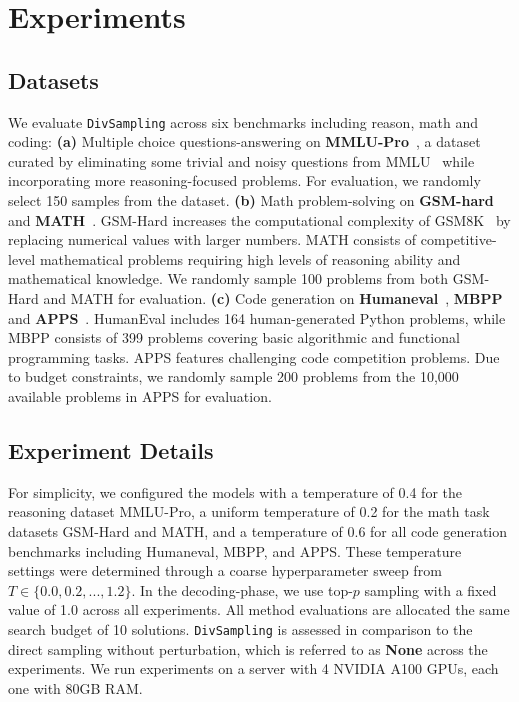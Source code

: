 \vspace{-0.3cm}
\section{Experiments}
\label{sec:exps}
\vspace{-0.2cm}
\subsection{Datasets}
\label{sec:exps_task}
We evaluate \texttt{DivSampling} across six benchmarks including reason, math and coding: \textbf{(a)} Multiple choice questions-answering on \textbf{MMLU-Pro}~\cite{wang2024mmlu}, a dataset curated by eliminating
some trivial and noisy questions from MMLU~\cite{hendrycks2020measuring}
while incorporating more reasoning-focused problems. %
For evaluation, we randomly select 150 samples from the dataset. \textbf{(b)} Math problem-solving on \textbf{GSM-hard}~\cite{gao2023pal} and \textbf{MATH}~\cite{hendrycks2021measuring}. GSM-Hard increases the computational complexity of GSM8K~\cite{cobbe2021training} by replacing numerical values with larger numbers. MATH consists of competitive-level mathematical problems requiring high levels of reasoning ability and mathematical knowledge. We randomly sample 100 problems from both GSM-Hard and MATH for evaluation. \textbf{(c)} Code generation on \textbf{Humaneval}~\cite{chen2021evaluating}, \textbf{MBPP}~\cite{austin2021program} and \textbf{APPS}~\cite{hendrycks2021measuringapps}.  HumanEval includes 164 human-generated Python problems, while MBPP consists of 399 problems covering basic algorithmic and functional programming tasks. APPS features challenging code competition problems. Due to budget constraints, we randomly sample 200 problems from the 10,000 available problems in APPS for evaluation.




 \subsection{Experiment Details} For simplicity, we configured the models with a temperature of 0.4 for the reasoning dataset MMLU-Pro, a uniform temperature of 0.2 for the math task datasets GSM-Hard and MATH, and a temperature of 0.6 for all code generation benchmarks including Humaneval, MBPP, and APPS. These temperature settings were determined through a coarse hyperparameter sweep from $T\in \{0.0, 0.2, ..., 1.2\}$. In the decoding-phase, we use top-$p$ sampling with a fixed value of 1.0 across all experiments.
All method evaluations are allocated the same search budget of 10 solutions. \texttt{DivSampling} is assessed in comparison to the direct sampling without perturbation, which is referred to as \textbf{None} across the experiments. We run experiments on a server with 4 NVIDIA A100 GPUs, each one with 80GB RAM.

